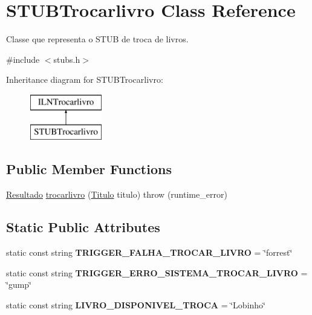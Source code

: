 \hypertarget{classSTUBTrocarlivro}{}\section{S\+T\+U\+B\+Trocarlivro Class Reference}
\label{classSTUBTrocarlivro}


Classe que representa o S\+T\+UB de troca de livros.  




{\ttfamily \#include $<$stubs.\+h$>$}

Inheritance diagram for S\+T\+U\+B\+Trocarlivro\+:\begin{figure}[H]
\begin{center}
\leavevmode
\includegraphics[height=2.000000cm]{classSTUBTrocarlivro}
\end{center}
\end{figure}
\subsection*{Public Member Functions}
\begin{DoxyCompactItemize}
\item 
\hyperlink{classResultado}{Resultado} \hyperlink{classSTUBTrocarlivro_ab88f0806c4f92ecf3069c4b036f5b7ef}{trocarlivro} (\hyperlink{classTitulo}{Titulo} titulo)  throw (runtime\+\_\+error)
\end{DoxyCompactItemize}
\subsection*{Static Public Attributes}
\begin{DoxyCompactItemize}
\item 
\mbox{\label{classSTUBTrocarlivro_a6971aeacf6543cbea47bb134aa71a396}} 
static const string {\bfseries T\+R\+I\+G\+G\+E\+R\+\_\+\+F\+A\+L\+H\+A\+\_\+\+T\+R\+O\+C\+A\+R\+\_\+\+L\+I\+V\+RO} = \char`\"{}forrest\char`\"{}
\item 
\mbox{\label{classSTUBTrocarlivro_a84a662aa66292900dd8a3eb176653516}} 
static const string {\bfseries T\+R\+I\+G\+G\+E\+R\+\_\+\+E\+R\+R\+O\+\_\+\+S\+I\+S\+T\+E\+M\+A\+\_\+\+T\+R\+O\+C\+A\+R\+\_\+\+L\+I\+V\+RO} = \char`\"{}gump\char`\"{}
\item 
\mbox{\label{classSTUBTrocarlivro_a8052c570d33fcb70e9ec015515deb5fd}} 
static const string {\bfseries L\+I\+V\+R\+O\+\_\+\+D\+I\+S\+P\+O\+N\+I\+V\+E\+L\+\_\+\+T\+R\+O\+CA} = \char`\"{}Lobinho\char`\"{}
\end{DoxyCompactItemize}


